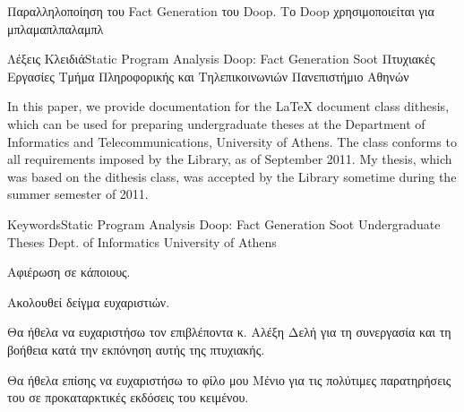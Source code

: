 \documentclass{dithesis}
\begin{document}
\maketitle

\begin{thesisabstract}[Περίληψη]
    Παραλληλοποίηση του Fact Generation του Doop. Το Doop χρησιμοποιείται για μπλαμαπλπαλαμπλ

                 {Λέξεις Κλειδιά}{Static Program Analysis}
                                 {Doop: Fact Generation}
                                 {Soot}
                                 {Πτυχιακές Εργασίες}
                                 {Τμήμα Πληροφορικής και Τηλεπικοινωνιών}
                                 {Πανεπιστήμιο Αθηνών}
\end{thesisabstract}

\begin{thesisabstract}[Abstract]
    In this paper, we provide documentation for the \LaTeX{} document class
    dithesis, which can be used for preparing undergraduate theses at the 
    Department of Informatics and Telecommunications, University of Athens.
    The class conforms to all requirements imposed by the Library, as of September
    2011.
    My thesis, which was based on the dithesis class, was accepted by the Library
    sometime during the summer semester of 2011.

                                {Keywords}{Static Program Analysis}
                                {Doop: Fact Generation}
                                {Soot}
                                {Undergraduate Theses}
                                {Dept. of Informatics}
                                {University of Athens}
\end{thesisabstract}

\begin{thesisdedication}
Αφιέρωση σε κάποιους.
\end{thesisdedication}

\begin{thesisacknowledgments}[Ευχαριστίες]
    Ακολουθεί δείγμα ευχαριστιών.

    Θα ήθελα να ευχαριστήσω τον επιβλέποντα κ. Αλέξη Δελή για τη συνεργασία και τη
    βοήθεια κατά την εκπόνηση αυτής της πτυχιακής.

    Θα ήθελα επίσης να ευχαριστήσω το φίλο μου Μένιο για τις πολύτιμες
    παρατηρήσεις του σε προκαταρκτικές εκδόσεις του κειμένου.
\end{thesisacknowledgments}
\end{document}
